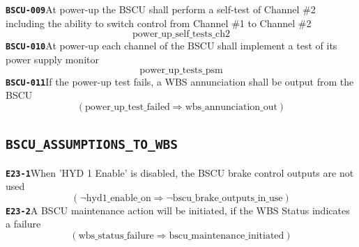 \documentclass[11pt,a4paper]{article}
\begin{document}
\noindent\textbf{\texttt{BSCU-009}}\quad At power-up the BSCU shall perform a self-test of Channel \#2 including the ability to switch control from Channel \#1 to Channel \#2
\begin{dmath*}
\text{power\_up\_self\_tests\_ch2}
\end{dmath*}
\noindent\textbf{\texttt{BSCU-010}}\quad At power-up each channel of the BSCU shall implement a test of its power supply monitor
\begin{dmath*}
\text{power\_up\_tests\_psm}
\end{dmath*}
\noindent\textbf{\texttt{BSCU-011}}\quad If the power-up test fails, a WBS annunciation shall be output from the BSCU
\begin{dmath*}
(\text{power\_up\_test\_failed} \Rightarrow \text{wbs\_annunciation\_out})
\end{dmath*}
\subsection*{\texttt{BSCU\_ASSUMPTIONS\_TO\_WBS}}
\noindent\textbf{\texttt{E23-1}}\quad When 'HYD 1 Enable' is disabled, the BSCU brake control outputs are not used
\begin{dmath*}
(\neg \text{hyd1\_enable\_on} \Rightarrow \neg \text{bscu\_brake\_outputs\_in\_use})
\end{dmath*}
\noindent\textbf{\texttt{E23-2}}\quad A BSCU maintenance action will be initiated, if the WBS Status indicates a failure
\begin{dmath*}
(\text{wbs\_status\_failure} \Rightarrow \text{bscu\_maintenance\_initiated})
\end{dmath*}
\end{document}
